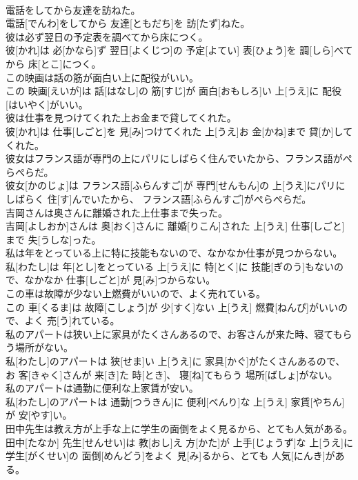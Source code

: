 \documentclass[8pt]{extreport}
\begin{document}
\begin{CJK}{UTF8}{min}
\\	電話をしてから友達を訪ねた。	
\\	電話[でんわ]をしてから 友達[ともだち]を 訪[たず]ねた。
\\	彼は必ず翌日の予定表を調べてから床につく。	
\\	彼[かれ]は 必[かなら]ず 翌日[よくじつ]の 予定[よてい] 表[ひょう]を 調[しら]べてから 床[とこ]につく。
\\	この映画は話の筋が面白い上に配役がいい。	
\\	この 映画[えいが]は 話[はなし]の 筋[すじ]が 面白[おもしろ]い 上[うえ]に 配役[はいやく]がいい。
\\	彼は仕事を見つけてくれた上お金まで貸してくれた。	
\\	彼[かれ]は 仕事[しごと]を 見[み]つけてくれた 上[うえ]お 金[かね]まで 貸[か]してくれた。
\\	彼女はフランス語が専門の上にパリにしばらく住んでいたから、フランス語がぺらぺらだ。	
\\	彼女[かのじょ]は フランス語[ふらんすご]が 専門[せんもん]の 上[うえ]にパリにしばらく 住[す]んでいたから、 フランス語[ふらんすご]がぺらぺらだ。
\\	吉岡さんは奥さんに離婚された上仕事まで失った。	
\\	吉岡[よしおか]さんは 奥[おく]さんに 離婚[りこん]された 上[うえ] 仕事[しごと]まで 失[うしな]った。
\\	私は年をとっている上に特に技能もないので、なかなか仕事が見つからない。	
\\	私[わたし]は 年[とし]をとっている 上[うえ]に 特[とく]に 技能[ぎのう]もないので、なかなか 仕事[しごと]が 見[み]つからない。
\\	この車は故障が少ない上燃費がいいので、よく売れている。	
\\	この 車[くるま]は 故障[こしょう]が 少[すく]ない 上[うえ] 燃費[ねんぴ]がいいので、よく 売[う]れている。
\\	私のアパートは狭い上に家具がたくさんあるので、お客さんが来た時、寝てもらう場所がない。	
\\	私[わたし]のアパートは 狭[せま]い 上[うえ]に 家具[かぐ]がたくさんあるので、お 客[きゃく]さんが 来[き]た 時[とき]、 寝[ね]てもらう 場所[ばしょ]がない。
\\	私のアパートは通勤に便利な上家賃が安い。	
\\	私[わたし]のアパートは 通勤[つうきん]に 便利[べんり]な 上[うえ] 家賃[やちん]が 安[やす]い。
\\	田中先生は教え方が上手な上に学生の面倒をよく見るから、とても人気がある。	
\\	田中[たなか] 先生[せんせい]は 教[おし]え 方[かた]が 上手[じょうず]な 上[うえ]に 学生[がくせい]の 面倒[めんどう]をよく 見[み]るから、とても 人気[にんき]がある。

\end{CJK}
\end{document}
